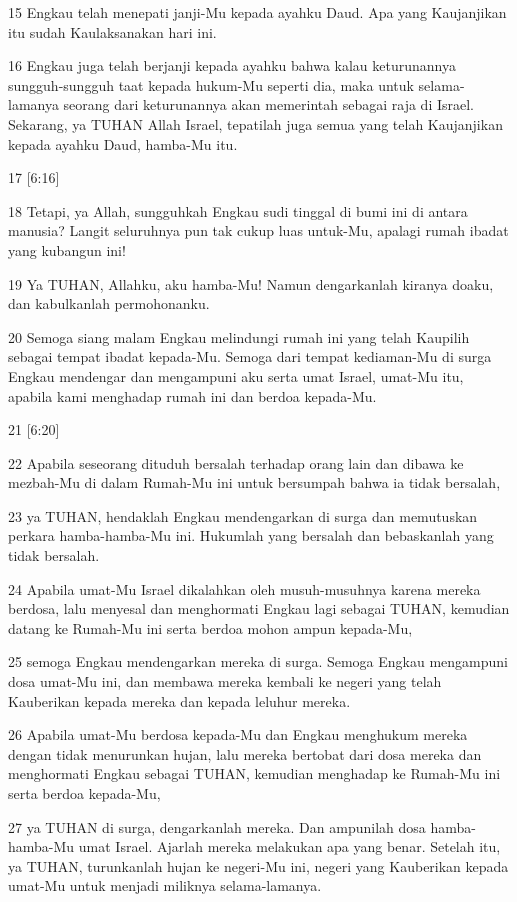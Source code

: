 \par 15 Engkau telah menepati janji-Mu kepada ayahku Daud. Apa yang Kaujanjikan itu sudah Kaulaksanakan hari ini.
\par 16 Engkau juga telah berjanji kepada ayahku bahwa kalau keturunannya sungguh-sungguh taat kepada hukum-Mu seperti dia, maka untuk selama-lamanya seorang dari keturunannya akan memerintah sebagai raja di Israel. Sekarang, ya TUHAN Allah Israel, tepatilah juga semua yang telah Kaujanjikan kepada ayahku Daud, hamba-Mu itu.
\par 17 [6:16]
\par 18 Tetapi, ya Allah, sungguhkah Engkau sudi tinggal di bumi ini di antara manusia? Langit seluruhnya pun tak cukup luas untuk-Mu, apalagi rumah ibadat yang kubangun ini!
\par 19 Ya TUHAN, Allahku, aku hamba-Mu! Namun dengarkanlah kiranya doaku, dan kabulkanlah permohonanku.
\par 20 Semoga siang malam Engkau melindungi rumah ini yang telah Kaupilih sebagai tempat ibadat kepada-Mu. Semoga dari tempat kediaman-Mu di surga Engkau mendengar dan mengampuni aku serta umat Israel, umat-Mu itu, apabila kami menghadap rumah ini dan berdoa kepada-Mu.
\par 21 [6:20]
\par 22 Apabila seseorang dituduh bersalah terhadap orang lain dan dibawa ke mezbah-Mu di dalam Rumah-Mu ini untuk bersumpah bahwa ia tidak bersalah,
\par 23 ya TUHAN, hendaklah Engkau mendengarkan di surga dan memutuskan perkara hamba-hamba-Mu ini. Hukumlah yang bersalah dan bebaskanlah yang tidak bersalah.
\par 24 Apabila umat-Mu Israel dikalahkan oleh musuh-musuhnya karena mereka berdosa, lalu menyesal dan menghormati Engkau lagi sebagai TUHAN, kemudian datang ke Rumah-Mu ini serta berdoa mohon ampun kepada-Mu,
\par 25 semoga Engkau mendengarkan mereka di surga. Semoga Engkau mengampuni dosa umat-Mu ini, dan membawa mereka kembali ke negeri yang telah Kauberikan kepada mereka dan kepada leluhur mereka.
\par 26 Apabila umat-Mu berdosa kepada-Mu dan Engkau menghukum mereka dengan tidak menurunkan hujan, lalu mereka bertobat dari dosa mereka dan menghormati Engkau sebagai TUHAN, kemudian menghadap ke Rumah-Mu ini serta berdoa kepada-Mu,
\par 27 ya TUHAN di surga, dengarkanlah mereka. Dan ampunilah dosa hamba-hamba-Mu umat Israel. Ajarlah mereka melakukan apa yang benar. Setelah itu, ya TUHAN, turunkanlah hujan ke negeri-Mu ini, negeri yang Kauberikan kepada umat-Mu untuk menjadi miliknya selama-lamanya.
